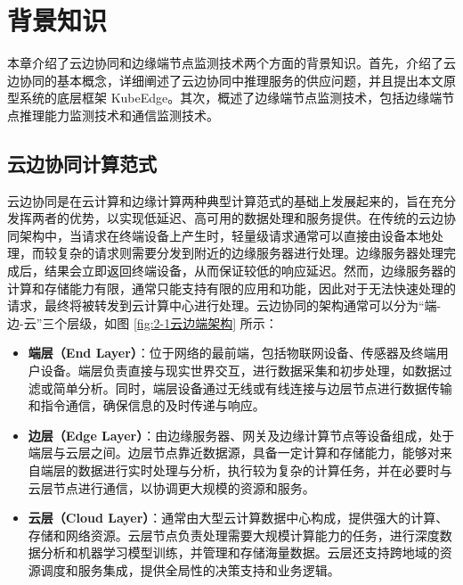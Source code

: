 
\chapter{背景知识}

本章介绍了云边协同和边缘端节点监测技术两个方面的背景知识。首先，介绍了云边协同的基本概念，详细阐述了云边协同中推理服务的供应问题，并且提出本文原型系统的底层框架 KubeEdge。其次，概述了边缘端节点监测技术，包括边缘端节点推理能力监测技术和通信监测技术。

\section{云边协同计算范式}

云边协同是在云计算和边缘计算两种典型计算范式的基础上发展起来的，旨在充分发挥两者的优势，以实现低延迟、高可用的数据处理和服务提供\cite{李波2021基于软件定义网络的云边协同架构研究综述}。在传统的云边协同架构中，当请求在终端设备上产生时，轻量级请求通常可以直接由设备本地处理，而较复杂的请求则需要分发到附近的边缘服务器进行处理。边缘服务器处理完成后，结果会立即返回终端设备，从而保证较低的响应延迟。然而，边缘服务器的计算和存储能力有限，通常只能支持有限的应用和功能，因此对于无法快速处理的请求，最终将被转发到云计算中心进行处理。云边协同的架构通常可以分为“端-边-云”三个层级\cite{mao2017survey,satyanarayanan2017emergence,吴大鹏2018端}，如图 \ref{fig:2-1云边端架构} 所示：

\begin{itemize} 
\item \textbf{端层（End Layer）}：位于网络的最前端，包括物联网设备、传感器及终端用户设备。端层负责直接与现实世界交互，进行数据采集和初步处理，如数据过滤或简单分析。同时，端层设备通过无线或有线连接与边层节点进行数据传输和指令通信，确保信息的及时传递与响应。
\item \textbf{边层（Edge Layer）}：由边缘服务器、网关及边缘计算节点等设备组成，处于端层与云层之间。边层节点靠近数据源，具备一定计算和存储能力，能够对来自端层的数据进行实时处理与分析，执行较为复杂的计算任务，并在必要时与云层节点进行通信，以协调更大规模的资源和服务。
\item \textbf{云层（Cloud Layer）}：通常由大型云计算数据中心构成，提供强大的计算、存储和网络资源。云层节点负责处理需要大规模计算能力的任务，进行深度数据分析和机器学习模型训练，并管理和存储海量数据。云层还支持跨地域的资源调度和服务集成，提供全局性的决策支持和业务逻辑。
\end{itemize}

